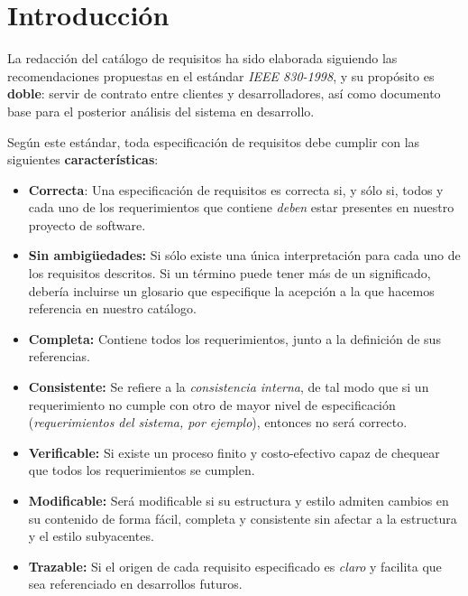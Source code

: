 
\section{Introducción}

La redacción del catálogo de requisitos ha sido elaborada siguiendo las recomendaciones propuestas en el estándar \textit{IEEE 830-1998}\cite{1998IEEESpecifications}, y su propósito es \textbf{doble}: servir de contrato entre clientes y desarrolladores, así como documento base para el posterior análisis del sistema en desarrollo.

Según este estándar, toda especificación de requisitos debe cumplir con las siguientes \textbf{características}:

\begin{itemize}
    \item \textbf{Correcta}: Una especificación de requisitos es correcta si, y sólo si, todos y cada uno de los requerimientos que contiene \textit{deben} estar presentes en nuestro proyecto de software.
    \item \textbf{Sin ambigüedades:} Si sólo existe una única interpretación para cada uno de los requisitos descritos. Si un término puede tener más de un significado, debería incluirse un glosario que especifique la acepción a la que hacemos referencia en nuestro catálogo.
    \item \textbf{Completa:} Contiene todos los requerimientos, junto a la definición de sus referencias.
    \item \textbf{Consistente:} Se refiere a la \textit{consistencia interna}, de tal modo que si un requerimiento no cumple con otro de mayor nivel de especificación (\textit{requerimientos del sistema, por ejemplo}), entonces no será correcto.
    \item \textbf{Verificable:} Si existe un proceso finito y costo-efectivo capaz de chequear que todos los requerimientos se cumplen.
    \item \textbf{Modificable:} Será modificable si su estructura y estilo admiten cambios en su contenido de forma fácil, completa y consistente sin afectar a la estructura y el estilo subyacentes.
    \item \textbf{Trazable:} Si el origen de cada requisito especificado es \textit{claro} y facilita que sea referenciado en desarrollos futuros.

\end{itemize}



